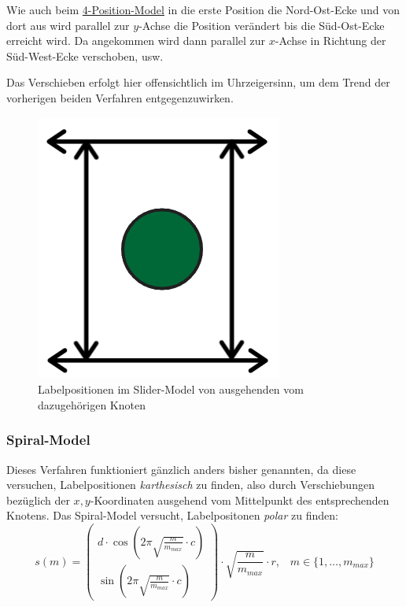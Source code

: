Wie auch beim \hyperref[subsubsec:4pos]{4-Position-Model} in die erste Position die Nord-Ost-Ecke und von dort aus wird parallel zur $y$-Achse die Position verändert bis die Süd-Ost-Ecke erreicht wird.
Da angekommen wird dann parallel zur $x$-Achse in Richtung der Süd-West-Ecke verschoben, usw.

Das Verschieben erfolgt hier offensichtlich im Uhrzeigersinn, um dem Trend der vorherigen beiden Verfahren entgegenzuwirken.

\begin{figure}[H]
    \centering
    \includegraphics[scale=0.4]{../img/slider}
    \caption{Labelpositionen im Slider-Model von ausgehenden vom dazugehörigen Knoten}
    \label{fig:slider}
\end{figure}

\subsubsection{Spiral-Model}
\label{subsubsec:spiral}

Dieses Verfahren funktioniert gänzlich anders bisher genannten, da diese versuchen, Labelpositionen \textit{karthesisch} zu finden, also durch Verschiebungen
bezüglich der $x,y$-Koordinaten ausgehend vom Mittelpunkt des entsprechenden Knotens. Das Spiral-Model versucht, Labelpositonen \textit{polar} zu finden:
$$ s(m) =
    \left(\begin{array}{c}
              d \cdot \cos (2 \pi \sqrt{\frac{m}{m_{max}}} \cdot c) \\
    \sin (2 \pi \sqrt{\frac{m}{m_{max}}} \cdot c)\end{array}\right) \cdot \sqrt{\frac{m}{m_{max}}} \cdot r,\; \; \; m \in \{1, \dots, m_{max} \}
$$

